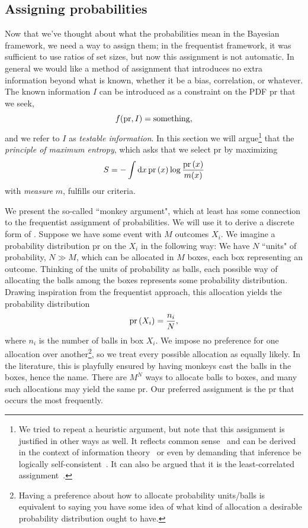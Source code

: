 \subsection{Assigning probabilities}


Now that we've thought about what the probabilities mean in the Bayesian
framework, we need a way to assign them; in the frequentist framework, it was
sufficient to use ratios of set sizes, but now this assignment is not automatic.
In general we would like a method of assignment that introduces no extra
information beyond what is known, whether it be a bias, correlation, or
whatever. The known information $I$ can be introduced as a constraint
on the PDF pr that we seek,
\begin{equation}
f({\rm pr},I)={\rm something},
\end{equation}
and we refer to $I$ as {\it testable information}.
In this section we will argue\footnote{We tried to repeat a heuristic argument,
but note that this assignment is justified in other ways as well.
It reflects common sense~\cite{jaynes_foundations_1963} and
can be derived in the context of information 
theory~\cite{shannon_mathematical_1948} or even by demanding
that inference be logically 
self-consistent~\cite{shore_axiomatic_1980}. It can also be argued
that it is the least-correlated assignment~\cite{Skilling1988}.} 
that the {\it principle of maximum 
entropy}, which asks that we select
pr by maximizing
\begin{equation}\label{eq:ShannonEntropy}
S=-\int \dd{x} \operatorname{pr}\left(x\right) \log \frac{\operatorname{pr}\left(x\right)}{m(x)}
\end{equation}
with {\it measure} $m$, fulfills our criteria.


We present the so-called ``monkey argument", which at least has some connection
to the frequentist assignment of probabilities. We will use it to derive a
discrete form of . Suppose we have some event with $M$
outcomes $X_i$. We imagine a probability distribution pr on the $X_i$ in the
following way: We have $N$ ``units" of probability, $N\gg M$, which can be
allocated in $M$ boxes, each box representing an outcome. Thinking of the
units of probability as balls, each possible way of allocating the balls among
the boxes represents some probability distribution. Drawing inspiration from the
frequentist approach, this allocation yields the probability distribution
\begin{equation}\label{eq:entropyProbability}
\operatorname{pr}\left(X_i\right)=\frac{n_i}{N},
\end{equation}
where $n_i$ is the number of balls in box $X_i$. We impose no
preference for one allocation over another\footnote{Having a preference about
how to allocate probability units/balls is equivalent to saying you have some
idea of what kind of allocation a desirable probability distribution ought to
have.}, so we treat every
possible allocation as equally likely. In the literature, this is playfully
ensured by having monkeys cast the balls in the boxes, hence the name.
There are $M^N$ ways to allocate balls to boxes, and many such allocations
may yield the same pr. Our preferred assignment is the pr that occurs the most 
frequently.

